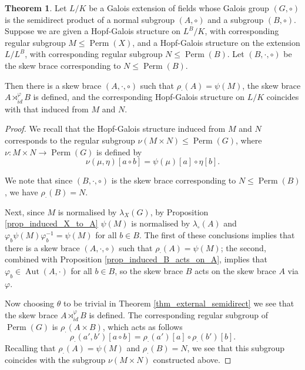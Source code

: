 \documentclass[12pt,a4paper, reqno]{amsart}
\theoremstyle{definition}
\newtheorem{theorem}{Theorem}[section]
\DeclareMathOperator{\Perm}{\mbox{Perm}}
\DeclareMathOperator{\Aut}{\mbox{Aut}}
\begin{document}
\begin{theorem} \label{thm_induced}
Let $ L/K $ be a Galois extension of fields whose Galois group $ (G,\circ) $ is the semidirect product of a normal subgroup $ (A,\circ) $ and a subgroup $ (B,\circ) $. Suppose we are given a Hopf-Galois structure on $ L^{B}/K $, with corresponding regular subgroup $ M \leq \Perm(X) $, and a Hopf-Galois structure on the extension $ L/L^{B} $, with corresponding regular subgroup $ N \leq \Perm(B) $. Let $ (B,\cdot,\circ) $ be the skew brace corresponding to $ N \leq \Perm(B) $.

Then there is a skew brace $ (A,\cdot,\circ) $ such that $ \rho_{\cdot}(A) = \psi(M) $, the skew brace $ A \rtimes^{\varphi}_{id} B $ is defined, and the corresponding Hopf-Galois structure on $ L/K $ coincides with that induced from $ M $ and $ N $. 
\end{theorem}
\begin{proof}
We recall that the Hopf-Galois structure induced from $ M $ and $ N $ corresponds to the regular subgroup $ \nu(M \times N) \leq \Perm(G) $, where $ \nu : M \times N \rightarrow \Perm(G) $ is defined by
\[ \nu(\mu,\eta)[a \circ b] = \psi(\mu)[a] \circ \eta[b]. \]

We note that since $ (B,\cdot,\circ) $ is the skew brace corresponding to $ N \leq \Perm(B) $, we have $ \rho_{\cdot}(B)=  N $. 

Next, since $ M $ is normalised by $ \lambda_{X}(G) $, by Proposition \ref{prop_induced_X_to_A} $ \psi(M) $ is normalised by $ \lambda_{\circ}(A) $ and $ \varphi_{b} \psi(M) \varphi_{b}^{-1} = \psi(M) $ for all $ b \in B $. The first of these conclusions implies that there is a skew brace $ (A,\cdot,\circ) $ such that $ \rho_{\cdot}(A) = \psi(M) $; the second, combined with Proposition \ref{prop_induced_B_acts_on_A}, implies that $ \varphi_{b} \in \Aut(A,\cdot) $ for all $ b \in B $, so the skew brace $ B $ acts on the skew brace  $ A $ via $ \varphi $. 

Now choosing $ \theta $ to be trivial in Theorem \ref{thm_external_semidirect} we see that the skew brace $ A \rtimes^{\varphi}_{id} B $ is defined. The corresponding regular subgroup of $ \Perm(G) $ is $ \rho_{\cdot}(A \times B) $, which acts as follows
\[ \rho_{\cdot}(a',b')[a \circ b] = \rho_{\cdot}(a')[a] \circ \rho_{\cdot}(b')[b]. \]
Recalling that $ \rho_{\cdot}(A) = \psi(M) $ and $ \rho_{\cdot}(B)=  N $, we see that this subgroup coincides with the subgroup $ \nu(M \times N) $ constructed above. 
\end{proof}
\end{document}
